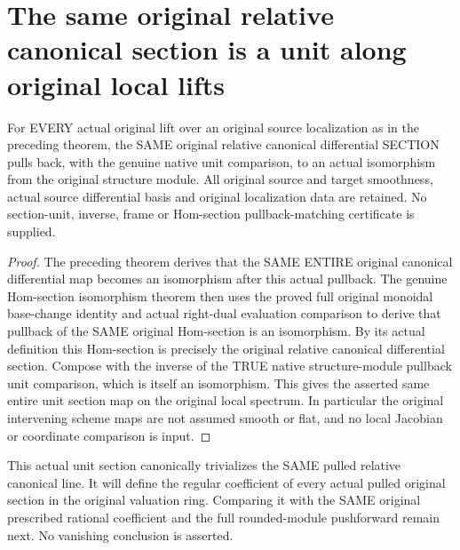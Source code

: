 \section{The same original relative canonical section is a unit along original local lifts}
\label{sec:valuative-canonical-section}

\begin{theorem}
\label{sc0-valuative-canonical-section:original-unit}
\leanok
For EVERY actual original lift over an original source localization
as in the preceding theorem, the SAME original relative canonical
differential SECTION pulls back, with the genuine native unit
comparison, to an actual isomorphism from the original structure
module. All original source and target smoothness, actual source
differential basis and original localization data are retained.
No section-unit, inverse, frame or Hom-section pullback-matching
certificate is supplied.
\end{theorem}
\begin{proof}
The preceding theorem derives that the SAME ENTIRE original
canonical differential map becomes an isomorphism after this
actual pullback. The genuine Hom-section isomorphism theorem then
uses the proved full original monoidal base-change identity and
actual right-dual evaluation comparison to derive that pullback
of the SAME original Hom-section is an isomorphism. By its actual
definition this Hom-section is precisely the original relative
canonical differential section. Compose with the inverse of the
TRUE native structure-module pullback unit comparison, which is
itself an isomorphism. This gives the asserted same entire unit
section map on the original local spectrum. In particular the
original intervening scheme maps are not assumed smooth or flat,
and no local Jacobian or coordinate comparison is input.
\end{proof}

This actual unit section canonically trivializes the SAME pulled
relative canonical line. It will define the regular coefficient
of every actual pulled original section in the original valuation
ring. Comparing it with the SAME original prescribed rational
coefficient and the full rounded-module pushforward remain next.
No vanishing conclusion is asserted.

